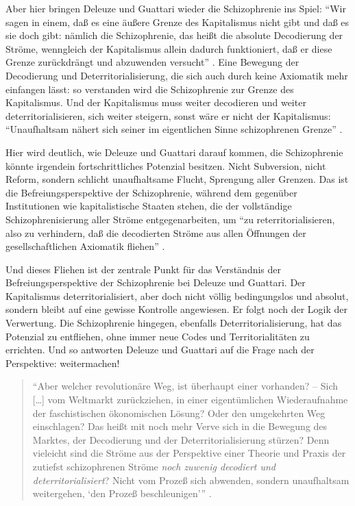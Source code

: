 \documentclass[12pt,
               paper=a4,
               twoside=false,
               onehalfspacing,
               bibliography=totoc,
               toc=graduated,
               ]{scrartcl}
\newcommand{\lips}{\dots\unkern}
\newcommand{\pc}[2]{\parencite[#1]{#2}}
\newcommand{\worries}[1]{\ifdraft{\textcolor{blue}{\texttt{(#1)}}}{}}
\newcommand{\dg}{Deleuze und Guattari\xspace}
\begin{document}
Aber hier bringen Deleuze und Guattari wieder die Schizophrenie ins
Spiel: "`Wir sagen in einem, daß es eine äußere Grenze des
Kapitalismus nicht gibt und daß es sie doch gibt: nämlich die
Schizophrenie, das heißt die absolute Decodierung der Ströme,
wenngleich der Kapitalismus allein dadurch funktioniert, daß er diese
Grenze zurückdrängt und abzuwenden versucht"' \pc{322}{ao}. Eine
Bewegung der Decodierung und Deterritorialisierung, die sich auch
durch keine Axiomatik mehr einfangen lässt: so verstanden wird die
Schizophrenie zur Grenze des Kapitalismus. Und der Kapitalismus muss
weiter decodieren und weiter deterritorialisieren, sich weiter
steigern, sonst wäre er nicht der Kapitalismus: "`Unaufhaltsam nähert
sich seiner im eigentlichen Sinne schizophrenen Grenze"' \pc{44}{ao}.

Hier wird deutlich, wie \dg darauf kommen, die Schizophrenie könnte
irgendein fortschrittliches Potenzial besitzen. Nicht Subversion,
nicht Reform, sondern schlicht unaufhaltsame Flucht, Sprengung aller
Grenzen. Das ist die Befreiungsperspektive der Schizophrenie, während
dem gegenüber Institutionen wie kapitalistische Staaten stehen, die
der vollständige Schizophrenisierung aller Ströme entgegenarbeiten, um
"`zu reterritorialisieren, also zu verhindern, daß die decodierten
Ströme aus allen Öffnungen der gesellschaftlichen Axiomatik fliehen"'
\pc{332}{ao}.

Und dieses Fliehen ist der zentrale Punkt für das Verständnis der
Befreiungsperspektive der Schizophrenie bei Deleuze und Guattari. Der
Kapitalismus deterritorialisiert, aber doch nicht völlig bedingungslos
und absolut, sondern bleibt auf eine gewisse Kontrolle angewiesen. Er
folgt noch der Logik der Verwertung. Die Schizophrenie hingegen,
ebenfalls Deterritorialisierung, hat das Potenzial zu entfliehen, ohne
immer neue Codes und Territorialitäten zu errichten. Und so antworten
Deleuze und Guattari auf die Frage nach der Perspektive: weitermachen!
%
\begin{spacing}{1}
\begin{quote}
\enquote{Aber welcher revolutionäre Weg, ist
überhaupt einer vorhanden? -- Sich [\lips] vom Weltmarkt zurückziehen,
in einer eigentümlichen Wiederaufnahme der faschistischen \glq
ökonomischen Lösung\grq? Oder den umgekehrten Weg einschlagen? Das
heißt mit noch mehr Verve sich in die Bewegung des Marktes, der
Decodierung und der Deterritorialisierung stürzen? Denn vieleicht sind
die Ströme aus der Perspektive einer Theorie und Praxis der
zutiefst schizophrenen Ströme \emph{noch zuwenig decodiert und
deterritorialisiert}? Nicht vom Prozeß sich abwenden, sondern
unaufhaltsam weitergehen, \enquote{den Prozeß beschleunigen}}
\pc{S. 308, meine Hervorh.}{ao}.
\end{quote}
\end{spacing}
\end{document}
